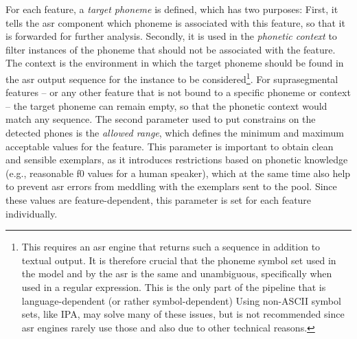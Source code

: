 For each feature, a \emph{target phoneme} is defined, which has two purposes:
First, it tells the \ac{asr} component which phoneme is associated with this feature, so that it is forwarded for further analysis.
Secondly, it is used in the \emph{phonetic context} to filter instances of the phoneme that should not be associated with the feature.
The context is the environment in which the target phoneme should be found in the \ac{asr} output sequence for the instance to be considered\footnote{This requires an \ac{asr} engine that returns such a sequence in addition to textual output.
It is therefore crucial that the phoneme symbol set used in the model and by the \ac{asr} is the same and unambiguous, specifically when used in a regular expression.
This is the only part of the pipeline that is language-dependent (or rather symbol-dependent)
Using non-ASCII symbol sets, like IPA, may solve many of these issues, but is not recommended since \ac{asr} engines rarely use those and also due to other technical reasons.}.
For suprasegmental features -- or any other feature that is not bound to a specific phoneme or context -- the target phoneme can remain empty, so that the phonetic context would match any sequence.
The second parameter used to put constrains on the detected phones is the \emph{allowed range}, which defines the minimum and maximum acceptable values for the feature.
This parameter is important to obtain clean and sensible exemplars, as it introduces restrictions based on phonetic knowledge (e.g., reasonable \ac{f0} values for a human speaker), which at the same time also help to prevent \ac{asr} errors from meddling with the exemplars sent to the pool.
Since these values are feature-dependent, this parameter is set for each feature individually.
%
